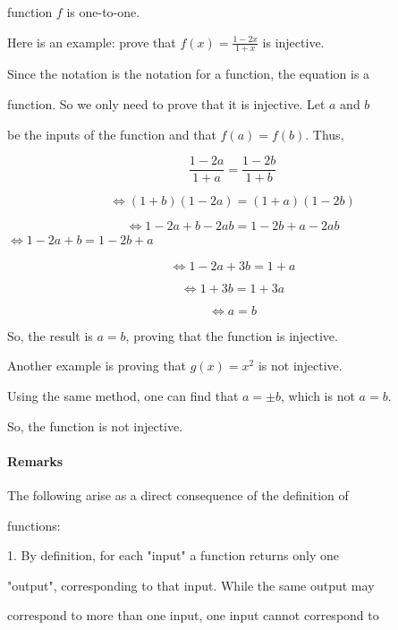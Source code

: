 function $f$ is one-to-one.



Here is an example: prove that $f(x)=\frac{1-2x}{1+x}$ is injective.



Since the notation is the notation for a function, the equation is a

function. So we only need to prove that it is injective. Let $a$ and $b$

be the inputs of the function and that $f(a)=f(b)$. Thus,



$$\frac{1-2a}{1+a}=\frac{1-2b}{1+b}$$



$$\Leftrightarrow(1+b)(1-2a)=(1+a)(1-2b)$$



$$\Leftrightarrow1-2a+b-2ab=1-2b+a-2ab$$$\Leftrightarrow1-2a+b=1-2b+a$



$$\Leftrightarrow1-2a+3b=1+a$$



$$\Leftrightarrow1+3b=1+3a$$



$$\Leftrightarrow a=b$$



So, the result is $a=b$, proving that the function is injective.



Another example is proving that $g(x)=x^2$ is not injective.



Using the same method, one can find that $a=\pm b$, which is not $a=b$.

So, the function is not injective.



\paragraph{Remarks}



The following arise as a direct consequence of the definition of

functions:



1.  By definition, for each "input" a function returns only one

    "output", corresponding to that input. While the same output may

    correspond to more than one input, one input cannot correspond to


